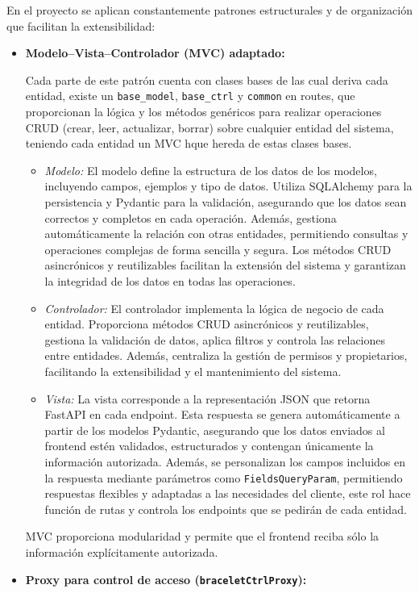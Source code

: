 \documentclass[12pt, a4paper]{article}
\begin{document}
En el proyecto se aplican constantemente patrones estructurales y de organización que facilitan la extensibilidad:

\begin{itemize}
	\item \textbf{Modelo–Vista–Controlador (MVC) adaptado:}  
	
	Cada parte de este patrón cuenta con clases bases de las cual deriva cada entidad, existe un  \texttt{base\_model},  \texttt{base\_ctrl} y  \texttt{common} en routes, que proporcionan la lógica y los métodos genéricos para realizar operaciones CRUD (crear, leer, actualizar, borrar) sobre cualquier entidad del sistema, teniendo cada entidad un MVC hque hereda de estas clases bases.
	\begin{itemize}
		\item \emph{Modelo:} El modelo define la estructura de los datos de los modelos, incluyendo campos, ejemplos y tipo de datos. Utiliza SQLAlchemy para la persistencia y Pydantic para la validación, asegurando que los datos sean correctos y completos en cada operación.
		Además, gestiona automáticamente la relación con otras entidades, permitiendo consultas y operaciones complejas de forma sencilla y segura. Los métodos CRUD asincrónicos y reutilizables facilitan la extensión del sistema y garantizan la integridad de los datos en todas las operaciones.
		\item \emph{Controlador:} El controlador implementa la lógica de negocio de cada entidad. Proporciona métodos CRUD asincrónicos y reutilizables, gestiona la validación de datos, aplica filtros y controla las relaciones entre entidades. Además, centraliza la gestión de permisos y propietarios, facilitando la extensibilidad y el mantenimiento del sistema.
		\item \emph{Vista:} La vista corresponde a la representación JSON que retorna FastAPI en cada endpoint. Esta respuesta se genera automáticamente a partir de los modelos Pydantic, asegurando que los datos enviados al frontend estén validados, estructurados y contengan únicamente la información autorizada. Además, se personalizan los campos incluidos en la respuesta mediante parámetros como \texttt{FieldsQueryParam}, permitiendo respuestas flexibles y adaptadas a las necesidades del cliente, este rol hace función de rutas y controla los endpoints que se pedirán de cada entidad.
	\end{itemize}
	MVC proporciona modularidad y permite que el frontend reciba sólo la información explícitamente autorizada.
	\item \textbf{Proxy para control de acceso (\texttt{braceletCtrlProxy}):}  

\end{itemize}
\end{document}
